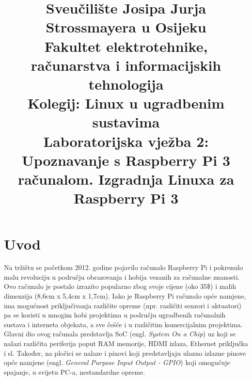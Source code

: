 \documentclass[11pt]{article}
\title{
	\Large Sveučilište Josipa Jurja Strossmayera u Osijeku \\
	Fakultet elektrotehnike, računarstva i informacijskih tehnologija \\
	\vspace{4cm}
	\Large Kolegij: Linux u ugradbenim sustavima \\
	\vspace{4cm}
	\Large \textbf{Laboratorijska vježba 2:\\Upoznavanje s Raspberry Pi 3
	računalom. Izgradnja Linuxa za Raspberry Pi 3}
	}
\date{}
\begin{document}
\maketitle
\thispagestyle{empty}
\newpage

\section{Uvod}
Na tržištu se početkom 2012. godine pojavilo računalo Raspberry Pi i pokrenulo
 malu revoluciju u području obrazovanja i hobija vezanih za računalne znanosti.
 Ovo računalo je postalo izrazito popularno zbog svoje cijene (oko 35\$) i
 malih dimenzija (8,6cm x 5,4cm x 1,7cm). Iako je Raspberry Pi računalo opće
 namjene, ima mogućnost priključivanja različite opreme (npr. različiti senzori
 i aktuatori) pa se koristi u mnogim hobi projektima u području ugradbenih
 računalnih sustava i interneta objekata, a sve češće i u različitim
 komercijalnim projektima. Glavni dio ovog računala predstavlja SoC (engl.
 \textit{System On a Chip}) uz koji se nalazi različita periferija poput RAM
 memorije, HDMI izlaza, Ethernet priključka i sl. Također, na pločici se
 nalaze i pinovi koji predstavljaju ulazno izlazne pinove opće namjene (engl.
 \textit{General Purpose Input Output - GPIO}) koji omogućuje spajanje, u
 svijetu PC-a, nestandardne opreme.
\end{document}
